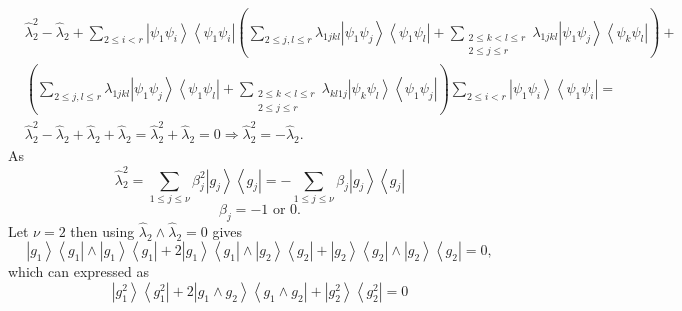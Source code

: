 \documentclass[aps,preprint]{revtex4}%
\begin{document}
\begin{enumerate}
\begin{align}
&  \hat{\lambda}_{2}^{2}-\hat{\lambda}_{2}+\sum_{2\leq i<r}\left\vert \psi
_{1}\psi_{i}\right\rangle \left\langle \psi_{1}\psi_{i}\right\vert \left(
\sum_{2\leq j,l\leq r}\lambda_{1jkl}\left\vert \psi_{1}\psi_{j}\right\rangle
\left\langle \psi_{1}\psi_{l}\right\vert +\sum_{\substack{2\leq k<l\leq
r\\2\leq j\leq r}}\lambda_{1jkl}\left\vert \psi_{1}\psi_{j}\right\rangle
\left\langle \psi_{k}\psi_{l}\right\vert \right)  +\\
&  \left(  \sum_{2\leq j,l\leq r}\lambda_{1jkl}\left\vert \psi_{1}\psi
_{j}\right\rangle \left\langle \psi_{1}\psi_{l}\right\vert +\sum
_{\substack{2\leq k<l\leq r\\2\leq j\leq r}}\lambda_{kl1j}\left\vert \psi
_{k}\psi_{l}\right\rangle \left\langle \psi_{1}\psi_{j}\right\vert \right)
\sum_{2\leq i<r}\left\vert \psi_{1}\psi_{i}\right\rangle \left\langle \psi
_{1}\psi_{i}\right\vert =\\
&  \hat{\lambda}_{2}^{2}-\hat{\lambda}_{2}+\hat{\lambda}_{2}+\hat{\lambda}%
_{2}=\hat{\lambda}_{2}^{2}+\hat{\lambda}_{2}=0\Rightarrow\hat{\lambda}_{2}%
^{2}=-\hat{\lambda}_{2}.
\end{align}
As
\begin{equation}
\hat{\lambda}_{2}^{2}=\sum_{1\leq j\leq\nu}\beta_{j}^{2}\left\vert
g_{j}\right\rangle \left\langle g_{j}\right\vert =-\sum_{1\leq j\leq\nu}%
\beta_{j}\left\vert g_{j}\right\rangle \left\langle g_{j}\right\vert
\end{equation}%
\begin{equation}
\beta_{j}=-1\text{ or }0.
\end{equation}
Let $\nu=2$ then using $\hat{\lambda}_{2}\wedge\hat{\lambda}_{2}=0$ gives
\begin{equation}
\left\vert g_{1}\right\rangle \left\langle g_{1}\right\vert \wedge\left\vert
g_{1}\right\rangle \left\langle g_{1}\right\vert +2\left\vert g_{1}%
\right\rangle \left\langle g_{1}\right\vert \wedge\left\vert g_{2}%
\right\rangle \left\langle g_{2}\right\vert +\left\vert g_{2}\right\rangle
\left\langle g_{2}\right\vert \wedge\left\vert g_{2}\right\rangle \left\langle
g_{2}\right\vert =0,
\end{equation}
which can expressed as
\begin{equation}
\left\vert g_{1}^{2}\right\rangle \left\langle g_{1}^{2}\right\vert
+2\left\vert g_{1}\wedge g_{2}\right\rangle \left\langle g_{1}\wedge
g_{2}\right\vert +\left\vert g_{2}^{2}\right\rangle \left\langle g_{2}%
^{2}\right\vert =0
\end{equation}

\end{enumerate}
\end{document}
